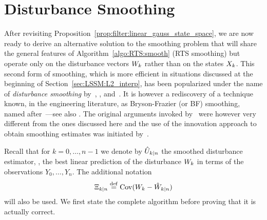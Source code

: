 \section{Disturbance Smoothing}
\label{sec:pos_comput:smoothing}
\label{sec:disturb_smooth}
After revisiting Proposition~\ref{prop:filter:linear_gauss_state_space}, we are
now ready to derive an alternative solution to the smoothing problem that will
share the general features of Algorithm~\ref{algo:RTS:smooth} (RTS smoothing)
but operate only on the disturbance vectors $W_k$ rather than on the states
$X_k$. This second form of smoothing, which is more efficient in situations
discussed at the beginning of Section~\ref{sec:LSSM:L2_interp}, has been
popularized under the name of {\em disturbance smoothing}
by~\cite{dejong:1988}, \cite{kohn:ansley:1989}, and~\cite{koopman:1993}. It is
however a rediscovery of a technique known, in the engineering literature, as
  Bryson-Frazier (or BF) smoothing, named after~\cite{bryson:frazier:1963}---see also \cite[Section 10.2.2]{kailath:sayed:hassibi:2000}. The
original arguments invoked by~\cite{bryson:frazier:1963} were however very
different from the ones discussed here and the use of the innovation approach
to obtain smoothing estimates was initiated by~\cite{kailath:frost:1968}.

Recall that for $k=0, \dots, n-1$ we denote by
$\hat{U}_{k|n}$ the smoothed disturbance estimator, \ie, the best
linear prediction of the disturbance $W_k$ in terms of the
observations $Y_0,\dots,Y_n$. The additional notation
\[
  \Xi_{k|n} \stackrel{\mathrm{def}}{=} \operatorname{Cov}(W_k - \hat{W}_{k|n})
\]
will also be used. We first state the complete algorithm before proving that it
is actually correct.

